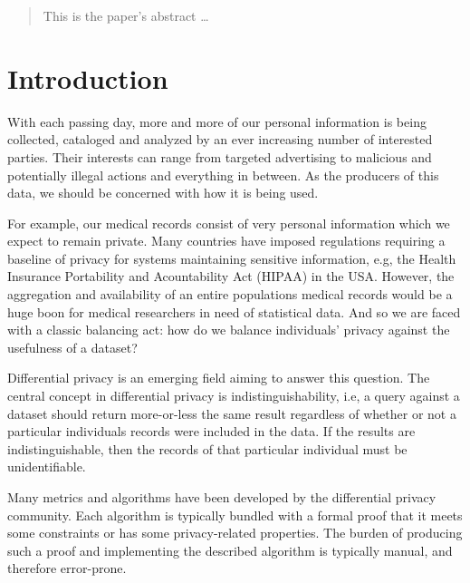 \documentclass[12pt]{article}
\begin{document}
\maketitle

\lstset{language=Haskell,basicstyle=\footnotesize,frame=single,
        numbers=left}

\begin{abstract}
This is the paper's abstract \ldots
\end{abstract}

\section{Introduction}\label{sec:introduction}


With each passing day, more and more of our personal information is being collected, cataloged and analyzed by an ever increasing number of interested parties.
Their interests can range from targeted advertising to malicious and potentially illegal actions and everything in between.
As the producers of this data, we should be concerned with how it is being used.

For example, our medical records consist of very personal information which we expect to remain private.
Many countries have imposed regulations requiring a baseline of privacy for systems maintaining sensitive information, e.g, the Health Insurance Portability and Acountability Act (HIPAA) in the USA.
However, the aggregation and availability of an entire populations medical records would be a huge boon for medical researchers in need of statistical data.
And so we are faced with a classic balancing act: how do we balance individuals' privacy against the usefulness of a dataset?

Differential privacy\cite{journals/cacm/Dwork11} is an emerging field aiming to answer this question.
The central concept in differential privacy is indistinguishability, i.e, a query against a dataset should return more-or-less the same result regardless of whether or not a particular individuals records were included in the data.
If the results are indistinguishable, then the records of that particular individual must be unidentifiable.

Many metrics and algorithms have been developed by the differential privacy community.
Each algorithm is typically bundled with a formal proof that it meets some constraints or has some privacy-related properties.
The burden of producing such a proof and implementing the described algorithm is typically manual, and therefore error-prone.
\end{document}
